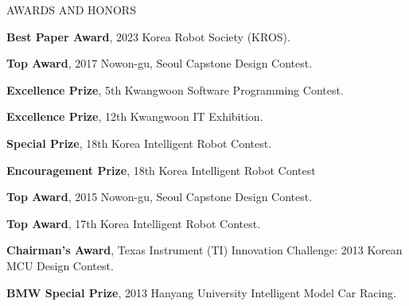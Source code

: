 \begin{rSection}{AWARDS AND HONORS}
    \begin{rSubsection}{}{}{}{}    
       \item \textbf{Best Paper Award}, 2023 Korea Robot Society (KROS).             
       \item \textbf{Top Award}, 2017 Nowon-gu, Seoul Capstone Design Contest.
       \item \textbf{Excellence Prize}, 5th Kwangwoon Software Programming Contest.
       \item \textbf{Excellence Prize}, 12th Kwangwoon IT Exhibition.
       \item \textbf{Special Prize}, 18th Korea Intelligent Robot Contest.
       \item \textbf{Encouragement Prize}, 18th Korea Intelligent Robot Contest
       \item \textbf{Top Award}, 2015 Nowon-gu, Seoul Capstone Design Contest.
       \item \textbf{Top Award}, 17th Korea Intelligent Robot Contest.
       \item \textbf{Chairman's Award}, Texas Instrument (TI) Innovation Challenge: 2013 Korean MCU Design Contest.
       \item \textbf{BMW Special Prize}, 2013 Hanyang University Intelligent Model Car Racing.
    \end{rSubsection}         
\end{rSection}
